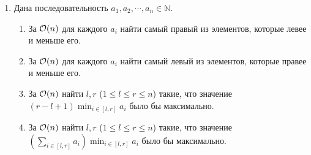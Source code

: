 \begin{enumerate}
  \item {}
    Дана последовательность $a_1, a_2, \cdots, a_n \in \mathbb{N}$.
    \begin{enumerate}
    	\item За $\mathcal{O}(n)$ для каждого $a_i$ найти самый правый из элементов, которые левее и меньше его.
    	\item За $\mathcal{O}(n)$ для каждого $a_i$ найти самый левый из элементов, которые правее и меньше его.
    	\item За $\mathcal{O}(n)$ найти $l, r$ ($1 \leq l \leq r \leq n$) такие, что значение $(r - l + 1) \min_{i \in [l, r]} a_i$ было бы максимально.
    	\item За $\mathcal{O}(n)$ найти $l, r$ ($1 \leq l \leq r \leq n$) такие, что значение $\left(\sum_{i \in [l, r]} a_i \right) \min_{i \in [l, r]} a_i$ было бы максимально.
    \end{enumerate}



    

\end{enumerate}

